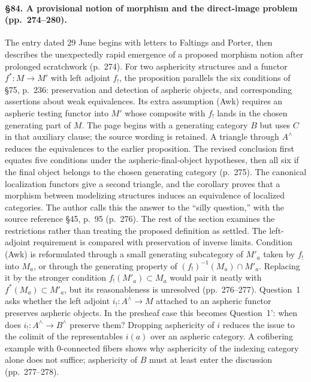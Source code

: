 \paragraph{\S84. A provisional notion of morphism and the direct-image problem (pp.\ 274--280).}
The entry dated 29 June begins with letters to Faltings and Porter, then describes the unexpectedly rapid emergence of a proposed morphism notion after prolonged scratchwork (p.\ 274). For two asphericity structures and a functor $f^*:M\to M'$ with left adjoint $f_!$, the proposition parallels the six conditions of \S75, p.\ 236: preservation and detection of aspheric objects, and corresponding assertions about weak equivalences. Its extra assumption (Awk) requires an aspheric testing functor into $M'$ whose composite with $f_!$ lands in the chosen generating part of $M$. The page begins with a generating category $B$ but uses $C$ in that auxiliary clause; the source wording is retained. A triangle through $A^\wedge$ reduces the equivalences to the earlier proposition. The revised conclusion first equates five conditions under the aspheric-final-object hypotheses, then all six if the final object belongs to the chosen generating category (p.\ 275). The canonical localization functors give a second triangle, and the corollary proves that a morphism between modelizing structures induces an equivalence of localized categories. The author calls this the answer to the “silly question,” with the source reference \S45, p.\ 95 (p.\ 276).
The rest of the section examines the restrictions rather than treating the proposed definition as settled. The left-adjoint requirement is compared with preservation of inverse limits. Condition (Awk) is reformulated through a small generating subcategory of $M'_a$ taken by $f_!$ into $M_a$, or through the generating property of $(f_!)^{-1}(M_a)\cap M'_a$. Replacing it by the stronger condition $f_!(M'_a)\subset M_a$ would pair it neatly with $f^*(M_a)\subset M'_a$, but its reasonableness is unresolved (pp.\ 276--277). Question~1 asks whether the left adjoint $i_!:A^\wedge\to M$ attached to an aspheric functor preserves aspheric objects. In the presheaf case this becomes Question~1': when does $i_!:A^\wedge\to B^\wedge$ preserve them? Dropping asphericity of $i$ reduces the issue to the colimit of the representables $i(a)$ over an aspheric category. A cofibering example with 0-connected fibers shows why asphericity of the indexing category alone does not suffice; asphericity of $B$ must at least enter the discussion (pp.\ 277--278).

